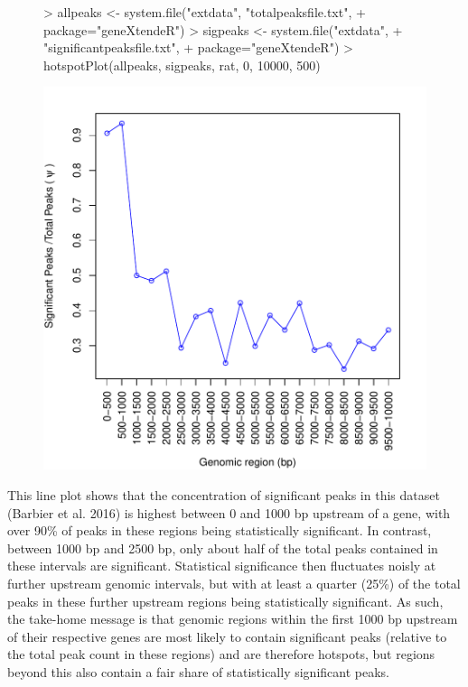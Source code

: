 \documentclass[12pt]{article}
\begin{document}
\begin{figure}[H]
\begin{center}
\begin{Schunk}
\begin{Sinput}
> allpeaks <- system.file("extdata", "totalpeaksfile.txt", 
+                         package="geneXtendeR")
> sigpeaks <- system.file("extdata", 
+                         "significantpeaksfile.txt",
+                         package="geneXtendeR")
> hotspotPlot(allpeaks, sigpeaks, rat, 0, 10000, 500)
\end{Sinput}
\end{Schunk}
\includegraphics{geneXtendeR-019}
\end{center}
\end{figure}

This line plot shows that the concentration of significant peaks in this dataset (Barbier et al. 2016) is highest between 0 and 1000 bp upstream of a gene, with over 90\% of peaks in these regions being statistically significant.  In contrast, between 1000 bp and 2500 bp, only about half of the total peaks contained in these intervals are significant.  Statistical significance then fluctuates noisly at further upstream genomic intervals, but with at least a quarter (25\%) of the total peaks in these further upstream regions being statistically significant.  As such, the take-home message is that genomic regions within the first 1000 bp upstream of their respective genes are most likely to contain significant peaks (relative to the total peak count in these regions) and are therefore hotspots, but regions beyond this also contain a fair share of statistically significant peaks.
\end{document}
